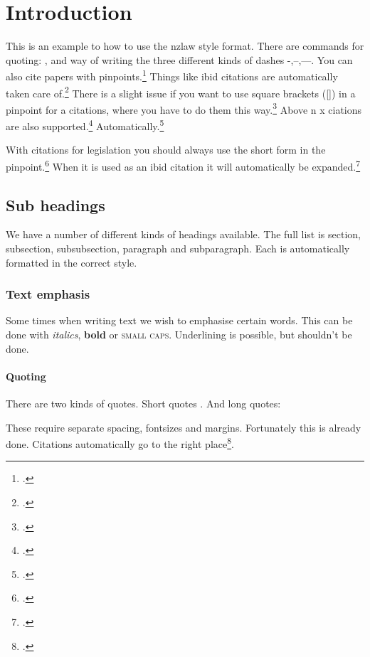\documentclass{nzlaw}
\begin{document}
\section{Introduction}
\label{sec:Introduction}

This is an example to how to use the nzlaw style format. 
There are commands for quoting: ,
and way of writing the three different kinds of dashes -,--,---.
You can also cite papers with pinpoints.\footcite[99]{astrazeneca}  
Things like ibid citations are automatically taken care 
of.\footcite[99]{astrazeneca} 
There is a slight issue if you want to use square brackets ([]) in a 
pinpoint for a citations, where you have to do them this
way.\footcite[22 and {[5]}]{astrazeneca} 
Above n x ciations are also supported.\footcite{z}
Automatically.\footcite[22]{astrazeneca} 

With citations for legislation you should always use the short
form in the pinpoint.\footcite[s 2]{gaming}
When it is used as an ibid citation it will automatically be 
expanded.\footcite[s 5]{gaming}

\subsection{Sub headings}
We have a number of different kinds of headings available. 
The full list is section, subsection, subsubsection, paragraph
and subparagraph. Each is automatically formatted in the correct 
style. 

\subsubsection{Text emphasis}
Some times when writing text we wish to emphasise certain words.
This can be done with \emph{italics}, \textbf{bold} or \textsc{small
caps}. Underlining is possible, but shouldn't be done.

\paragraph{Quoting}

There are two kinds of quotes. Short quotes . And long quotes:

\begin{longquote}
These require separate spacing, fontsizes and margins. Fortunately
this is already done. Citations automatically go to the right place\footcite{letter}.
\end{longquote}
\end{document}
